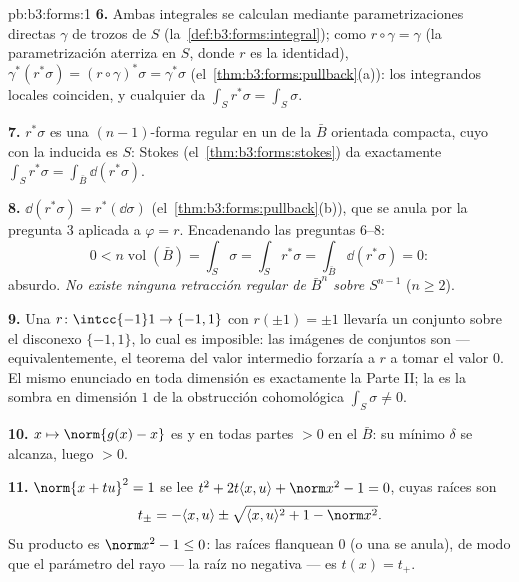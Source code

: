 \begin{solution}{pb:b3:forms:1}
\textbf{6.} Ambas integrales se calculan mediante parametrizaciones
directas $\gamma$ de trozos de $S$ (la~\cref{def:b3:forms:integral});
como $r\circ\gamma =
\gamma$ (la parametrización aterriza en $S$, donde $r$ es la identidad),
$\gamma^*(r^*\sigma) = (r\circ\gamma)^*\sigma =
\gamma^*\sigma$ (el~\cref{thm:b3:forms:pullback}(a)): los integrandos
locales coinciden, y cualquier  da
$\int_Sr^*\sigma = \int_S\sigma$.

\textbf{7.} $r^*\sigma$ es una $(n-1)$-forma regular en un
 de la $\bar B$ orientada
compacta, cuyo
 con la
 inducida es $S$: Stokes
(el~\cref{thm:b3:forms:stokes}) da exactamente
$\int_Sr^*\sigma = \int_{\bar B}\dd(r^*\sigma)$.

\textbf{8.} $\dd(r^*\sigma) = r^*(\dd\sigma)$
(el~\cref{thm:b3:forms:pullback}(b)), que se anula por la pregunta 3
aplicada a $\varphi = r$. Encadenando las preguntas
6--8:
\[
0 < n\operatorname{vol}(\bar B) = \int_S\sigma =
\int_Sr^*\sigma = \int_{\bar B}\dd(r^*\sigma) = 0 :
\]
absurdo. \emph{No existe ninguna retracción regular de $\bar B^n$ sobre
$S^{n-1}$} ($n \geq 2$).

\textbf{9.} Una $r\colon\intcc{-1}1\to\{-1,1\}$
 con $r(\pm1) = \pm1$
llevaría un conjunto  sobre el
disconexo $\{-1, 1\}$, lo cual es imposible: las imágenes
 de conjuntos
 son
 --- equivalentemente, el
teorema del valor intermedio forzaría a $r$ a tomar el valor $0$. El
mismo enunciado en toda dimensión es exactamente la Parte II; la
 es la sombra en dimensión
$1$ de la obstrucción cohomológica $\int_S\sigma \neq 0$.

\textbf{10.} $x \mapsto \norm{g(x) - x}$ es
 y en todas partes $> 0$ en
el  $\bar B$: su mínimo
$\delta$ se alcanza, luego $> 0$.

\textbf{11.} $\norm{x + tu}^2 = 1$ se lee $t^2 + 2t\langle x,
u\rangle + \norm x^2 - 1 = 0$, cuyas raíces son
\[
t_\pm = -\langle x, u\rangle \pm \sqrt{\langle x,
u\rangle^2 + 1 - \norm x^2} .
\]
Su producto es $\norm x^2 - 1 \leq 0$: las raíces flanquean $0$ (o una
se anula), de modo que el parámetro del rayo --- la raíz no negativa ---
es $t(x) = t_+$.


\end{solution}
